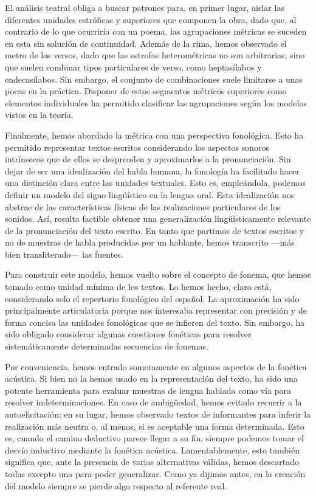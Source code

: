 El análisis teatral obliga a buscar patrones para, en primer lugar, aislar las diferentes unidades estróficas y superiores que componen la obra, dado que, al contrario de lo que ocurriría con un poema, las agrupaciones métricas se suceden en esta sin solución de continuidad. Además de la rima, hemos observado el metro de los versos, dado que las estrofas heterométricas no son arbitrarias, sino que suelen combinar tipos particulares de verso, como heptasílabos y endecasílabos. Sin embargo, el conjunto de combinaciones suele limitarse a unas pocas en la práctica. Disponer de estos segmentos métricos superiores como elementos individuales ha permitido clasificar las agrupaciones según los modelos vistos en la teoría.

Finalmente, hemos abordado la métrica con una perspectiva fonológica. Esto ha permitido representar textos escritos considerando los aspectos sonoros intrínsecos que de ellos se desprenden y aproximarlos a la pronunciación. Sin dejar de ser una idealización del habla humana, la fonología ha facilitado hacer una distinción clara entre las unidades textuales. Esto es, empleándola, podemos definir un modelo del signo lingüístico en la lengua oral. Esta idealización nos abstrae de las características físicas de las realizaciones particulares de los sonidos. Así, resulta factible obtener una generalización lingüísticamente relevante de la pronunciación del texto escrito. En tanto que partimos de  textos escritos y no de muestras de habla producidas por un hablante, hemos transcrito —más bien transliterado— las fuentes. 

Para construir este modelo, hemos vuelto sobre el concepto de fonema, que hemos tomado como unidad mínima de los textos. Lo hemos hecho, claro está, considerando solo el repertorio fonológico del español. La aproximación ha sido principalmente articulatoria porque nos interesaba representar con precisión y de forma concisa las unidades fonológicas que se infieren del texto. Sin embargo, ha sido obligado considerar algunas cuestiones fonéticas para resolver sistemáticamente determinadas secuencias de fonemas.

Por conveniencia, hemos entrado someramente en algunos aspectos de la fonética acústica. Si bien no la hemos usado en la representación del texto, ha sido una potente herramienta para evaluar muestras de lengua hablada como vía para resolver indeterminaciones. En caso de ambigüedad, hemos evitado recurrir a la autoelicitación; en su lugar, hemos observado textos de informantes para inferir la realización más neutra o, al menos, si es aceptable una forma determinada. Esto es, cuando el camino deductivo parece llegar a su fin, siempre podemos tomar el desvío inductivo mediante la fonética acústica. Lamentablemente, esto también significa que, ante la presencia de varias alternativas válidas, hemos descartado todas excepto una para poder generalizar. Como ya dijimos antes, en la creación del modelo siempre se pierde algo respecto al referente real.



